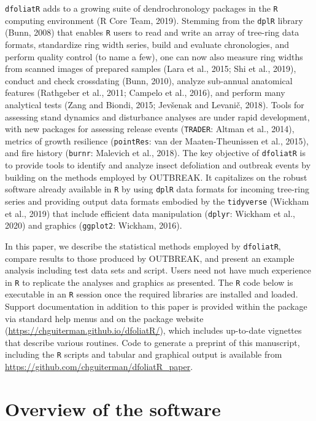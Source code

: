 \documentclass[review]{elsarticle} %
\begin{document}
\texttt{dfoliatR} adds to a growing suite of dendrochronology packages in the \texttt{R} computing environment (R Core Team, 2019). Stemming from the \texttt{dplR} library (Bunn, 2008) that enables \texttt{R} users to read and write an array of tree-ring data formats, standardize ring width series, build and evaluate chronologies, and perform quality control (to name a few), one can now also measure ring widths from scanned images of prepared samples (Lara et al., 2015; Shi et al., 2019), conduct and check crossdating (Bunn, 2010), analyze sub-annual anatomical features (Rathgeber et al., 2011; Campelo et al., 2016), and perform many analytical tests (Zang and Biondi, 2015; Jevšenak and Levanič, 2018). Tools for assessing stand dynamics and disturbance analyses are under rapid development, with new packages for assessing release events (\texttt{TRADER}: Altman et al., 2014), metrics of growth resilience (\texttt{pointRes}: van der Maaten-Theunissen et al., 2015), and fire history (\texttt{burnr}: Malevich et al., 2018). The key objective of \texttt{dfoliatR} is to provide tools to identify and analyze insect defoliation and outbreak events by building on the methods employed by OUTBREAK. It capitalizes on the robust software already available in \texttt{R} by using \texttt{dplR} data formats for incoming tree-ring series and providing output data formats embodied by the \texttt{tidyverse} (Wickham et al., 2019) that include efficient data manipulation (\texttt{dplyr}: Wickham et al., 2020) and graphics (\texttt{ggplot2}: Wickham, 2016).

In this paper, we describe the statistical methods employed by \texttt{dfoliatR}, compare results to those produced by OUTBREAK, and present an example analysis including test data sets and script. Users need not have much experience in \texttt{R} to replicate the analyses and graphics as presented. The \texttt{R} code below is executable in an \texttt{R} session once the required libraries are installed and loaded. Support documentation in addition to this paper is provided within the package via standard help menus and on the package website (\url{https://chguiterman.github.io/dfoliatR/}), which includes up-to-date vignettes that describe various routines. Code to generate a preprint of this manuscript, including the \texttt{R} scripts and tabular and graphical output is available from \url{https://github.com/chguiterman/dfoliatR_paper}.

\hypertarget{overview-of-the-software}{%
\section{Overview of the software}\label{overview-of-the-software}}
\end{document}
